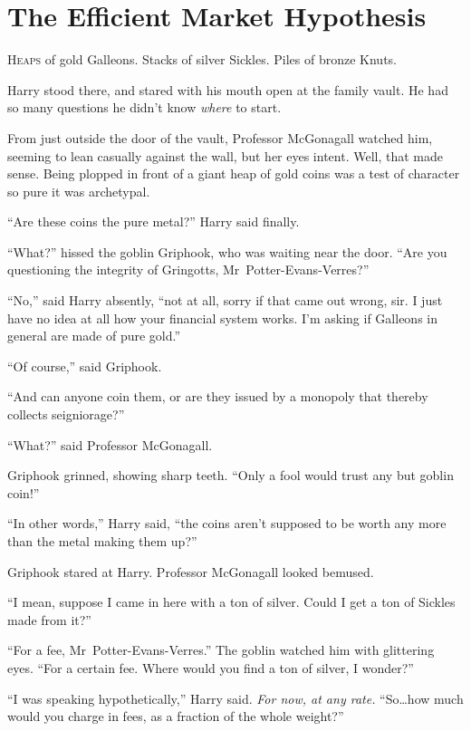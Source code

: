 \chapter[The Efficient Market Hypothesis]{The Efficient Market Hypothesis\protect\footnotemark}

\lettrine{H}{eaps} of gold Galleons. Stacks of silver Sickles. Piles of bronze Knuts.

Harry stood there, and stared with his mouth open at the family vault. He had so many questions he didn’t know \emph{where} to start.

From just outside the door of the vault, Professor McGonagall watched him, seeming to lean casually against the wall, but her eyes intent. Well, that made sense. Being plopped in front of a giant heap of gold coins was a test of character so pure it was archetypal.

“Are these coins the pure metal?” Harry said finally.

“What?” hissed the goblin Griphook, who was waiting near the door. “Are you questioning the integrity of Gringotts, Mr~Potter-Evans-Verres?”

“No,” said Harry absently, “not at all, sorry if that came out wrong, sir. I just have no idea at all how your financial system works. I’m asking if Galleons in general are made of pure gold.”

“Of course,” said Griphook.

“And can anyone coin them, or are they issued by a monopoly that thereby collects seigniorage?”

“What?” said Professor McGonagall.

Griphook grinned, showing sharp teeth. “Only a fool would trust any but goblin coin!”

“In other words,” Harry said, “the coins aren’t supposed to be worth any more than the metal making them up?”

Griphook stared at Harry. Professor McGonagall looked bemused.

“I mean, suppose I came in here with a ton of silver. Could I get a ton of Sickles made from it?”

“For a fee, Mr~Potter-Evans-Verres.” The goblin watched him with glittering eyes. “For a certain fee. Where would you find a ton of silver, I wonder?”

“I was speaking hypothetically,” Harry said. \emph{For now, at any rate.} “So…how much would you charge in fees, as a fraction of the whole weight?”

